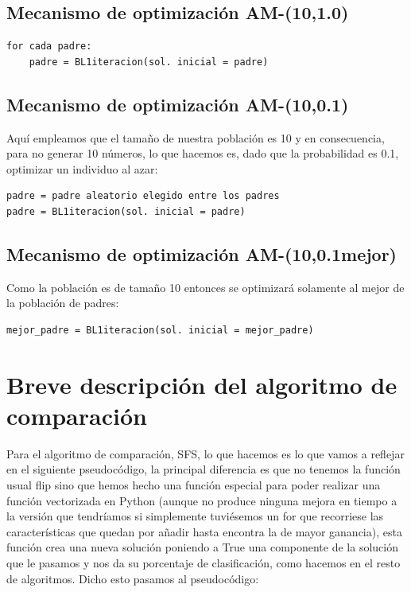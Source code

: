 \documentclass[10pt,a4paper]{article}
\begin{document}
\newpage

\subsection{\color[rgb]{0.0,0.0,0.51}Mecanismo de optimización AM-(10,1.0)}

\begin{lstlisting}
for cada padre:
	padre = BL1iteracion(sol. inicial = padre)
\end{lstlisting}

\subsection{\color[rgb]{0.0,0.0,0.51}Mecanismo de optimización AM-(10,0.1)}

Aquí empleamos que el tamaño de nuestra población es 10 y en consecuencia, para no generar 10 números, lo que hacemos es, dado que la probabilidad es 0.1, optimizar un individuo al azar:\\

\begin{lstlisting}
padre = padre aleatorio elegido entre los padres
padre = BL1iteracion(sol. inicial = padre)
\end{lstlisting}
\subsection{\color[rgb]{0.0,0.0,0.51}Mecanismo de optimización AM-(10,0.1mejor)}

Como la población es de tamaño 10 entonces se optimizará solamente al mejor de la población de padres:\\

\begin{lstlisting}
mejor_padre = BL1iteracion(sol. inicial = mejor_padre)
\end{lstlisting}

\newpage

\section{\color[rgb]{0.0,0.0,0.21}Breve descripción del algoritmo de comparación}

Para el algoritmo de comparación, SFS, lo que hacemos es lo que vamos a reflejar en el siguiente pseudocódigo, la principal diferencia es que no tenemos la función usual flip sino que hemos hecho una función especial para poder realizar una función vectorizada en Python (aunque no produce ninguna mejora en tiempo a la versión que tendríamos si simplemente tuviésemos un for que recorriese las características que quedan por añadir hasta encontra la de mayor ganancia), esta función crea una nueva solución poniendo a True una componente de la solución que le pasamos y nos da su porcentaje de clasificación, como hacemos en el resto de algoritmos. Dicho esto pasamos al pseudocódigo:
\end{document}
